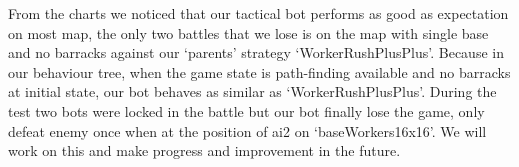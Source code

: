 

From the charts we noticed that our tactical bot performs as good as expectation on most map, the only two battles
that we lose is on the map with single base and no barracks against our ‘parents’ strategy ‘WorkerRushPlusPlus’.
Because in our behaviour tree, when the game state is path-finding available and no barracks at initial state,
our bot behaves as similar as ‘WorkerRushPlusPlus’. During the test two bots were locked in the battle but our
bot finally lose the game, only defeat enemy once when at the position of ai2 on ‘baseWorkers16x16’. We will
work on this and make progress and improvement in the future.
